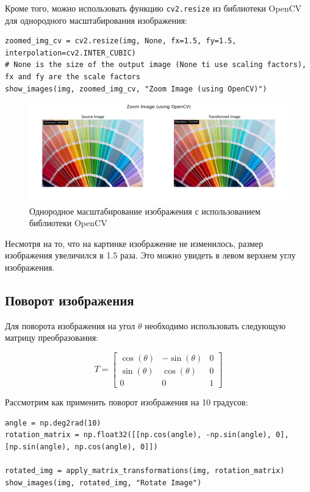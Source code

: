 Кроме того, можно использовать функцию \texttt{cv2.resize} из библиотеки OpenCV для однородного масштабирования изображения:
\begin{lstlisting}[style=python_white, caption={Исходный код для однородного масштабирования изображения с использованием библиотеки OpenCV}]
zoomed_img_cv = cv2.resize(img, None, fx=1.5, fy=1.5, interpolation=cv2.INTER_CUBIC)
# None is the size of the output image (None ti use scaling factors), fx and fy are the scale factors
show_images(img, zoomed_img_cv, "Zoom Image (using OpenCV)")
\end{lstlisting}

\begin{figure}[ht]
    \includegraphics[width=\textwidth]{../results/Zoom Image (using OpenCV).png}
    \caption{Однородное масштабирование изображения с использованием библиотеки OpenCV}
    \label{fig:uniform_scale_image_cv}
\end{figure}

Несмотря на то, что на картинке изображение не изменилось, размер изображения увеличился в 1.5 раза. Это можно увидеть в левом верхнем углу изображения.

\subsection{Поворот изображения}

Для поворота изображения на угол $\theta$ необходимо использовать следующую матрицу преобразования:

\begin{equation}
T = \begin{bmatrix}
    \cos(\theta) & -\sin(\theta) & 0 \\
    \sin(\theta) & \cos(\theta) & 0 \\
    0 & 0 & 1
\end{bmatrix}
\end{equation}

Рассмотрим как применить поворот изображения на 10 градусов:
\begin{lstlisting}[style=python_white, caption={Исходный код для поворота изображения}]
angle = np.deg2rad(10)
rotation_matrix = np.float32([[np.cos(angle), -np.sin(angle), 0], [np.sin(angle), np.cos(angle), 0]])

rotated_img = apply_matrix_transformations(img, rotation_matrix)
show_images(img, rotated_img, "Rotate Image")
\end{lstlisting}

